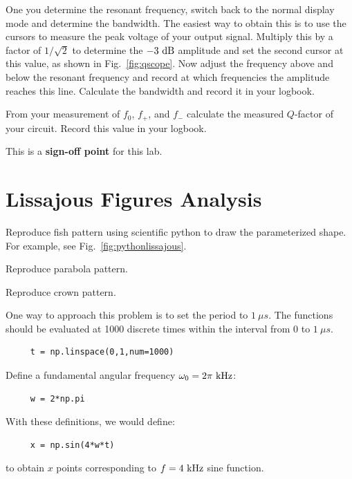 \begin{measurement} One you determine the resonant frequency, switch back to the normal
display mode and determine the bandwidth.  The easiest way to obtain
this is to use the cursors to measure the peak voltage of your output
signal.  Multiply this by a factor of $1/\sqrt{2}$ to determine
the $-3~\rm dB$ amplitude and set the second cursor at this value, as
shown in Fig.~\ref{fig:qscope}.  Now adjust the frequency above and
below the resonant frequency and record at which frequencies the
amplitude reaches this line. Calculate the bandwidth and record it in your logbook.
\end{measurement}

\begin{measurement} From your measurement of $f_0$, $f_+$, and $f_-$ calculate the
measured $Q$-factor of your circuit. Record this value in your logbook. 
\end{measurement}


\noindent
This is a \textbf{sign-off point} for this lab. 

\section{Lissajous Figures Analysis}

\begin{plot} Reproduce fish pattern using scientific
python to draw the parameterized shape.  For
example, see Fig.~\ref{fig:pythonlissajous}. \end{plot}
\begin{plot} Reproduce  parabola pattern. \end{plot} 
\begin{plot} Reproduce crown pattern. \end{plot}

One way to approach this problem is to set the period to $1~\mu s$.
The functions should be evaluated at 1000 discrete times within the
interval from 0 to $1~\mu s$.
\begin{verbatim}
     t = np.linspace(0,1,num=1000)
\end{verbatim}
Define a fundamental angular frequency $\omega_0 = 2 \pi~\rm kHz$:
\begin{verbatim}
     w = 2*np.pi
\end{verbatim}
With these definitions, we would define:
\begin{verbatim}
     x = np.sin(4*w*t)
\end{verbatim}
to obtain $x$ points corresponding to $f=4~\rm kHz$ sine function.

